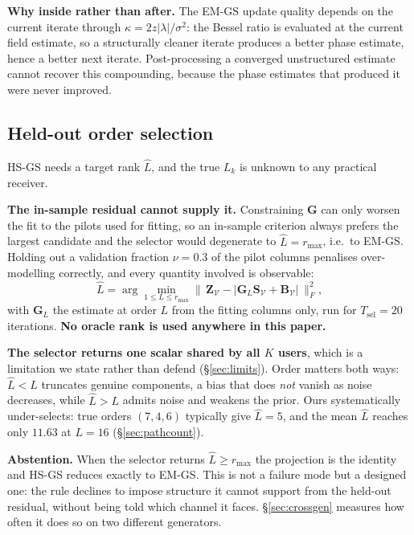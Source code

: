 \documentclass[journal]{IEEEtran}
\newcommand{\bG}{\mathbf{G}}
\newcommand{\bS}{\mathbf{S}}
\newcommand{\bB}{\mathbf{B}}
\newcommand{\bZ}{\mathbf{Z}}
\newcommand{\rmax}{r_{\max}}
\begin{document}
\textbf{Why inside rather than after.} The EM-GS update quality depends on the
current iterate through $\kappa=2z|\lambda|/\sigma^2$: the Bessel ratio is
evaluated at the current field estimate, so a structurally cleaner iterate
produces a better phase estimate, hence a better next iterate. Post-processing
a converged unstructured estimate cannot recover this compounding, because the
phase estimates that produced it were never improved.

\subsection{Held-out order selection}

HS-GS needs a target rank $\hat L$, and the true $L_k$ is unknown to any
practical receiver.

\textbf{The in-sample residual cannot supply it.} Constraining $\bG$ can only
worsen the fit to the pilots used for fitting, so an in-sample criterion always
prefers the largest candidate and the selector would degenerate to
$\hat L=\rmax$, i.e.\ to EM-GS. Holding out a validation fraction $\nu=0.3$ of
the pilot columns penalises over-modelling correctly, and every quantity
involved is observable:
\begin{equation}\label{eq:order}
\hat L=\arg\min_{1\le L\le \rmax}
\bigl\|\,\bZ_{\mathcal{V}}-\bigl|\bG_L\bS_{\mathcal{V}}
+\bB_{\mathcal{V}}\bigr|\,\bigr\|_F^{2},
\end{equation}
with $\bG_L$ the estimate at order $L$ from the fitting columns only, run for
$T_{\mathrm{sel}}=20$ iterations. \textbf{No oracle rank is used anywhere in
this paper.}

\textbf{The selector returns one scalar shared by all $K$ users}, which is a
limitation we state rather than defend (\S\ref{sec:limits}). Order matters both
ways: $\hat L<L$ truncates genuine components, a bias that does \emph{not}
vanish as noise decreases, while $\hat L>L$ admits noise and weakens the prior.
Ours systematically under-selects: true orders $(7,4,6)$ typically give
$\hat L=5$, and the mean $\hat L$ reaches only $11.63$ at $L=16$
(\S\ref{sec:pathcount}).

\textbf{Abstention.} When the selector returns $\hat L\ge\rmax$ the projection
is the identity and HS-GS reduces exactly to EM-GS. This is not a failure mode
but a designed one: the rule declines to impose structure it cannot support
from the held-out residual, without being told which channel it faces.
\S\ref{sec:crossgen} measures how often it does so on two different generators.
\end{document}
